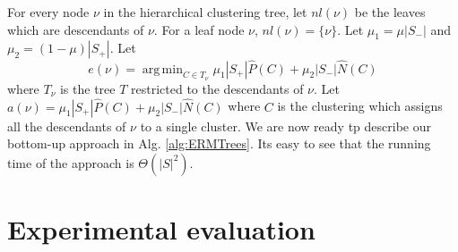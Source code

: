 \documentclass[12pt]{article}
\DeclareMathOperator*{\argmin}{arg\,min}
\begin{document}
For every node $\nu$ in the hierarchical clustering tree, let $nl(\nu)$ be the leaves which are descendants of $\nu$. For a leaf node $\nu$, $nl(\nu) = \{\nu\}$. Let $\mu_1 = \mu|S_-|$ and $\mu_2 = (1-\mu)|S_+|$. Let $$e(\nu) = \argmin_{C \in T_{\nu}} \mu_1|S_+|\hat P(C) + \mu_2|S_-|\hat N(C)$$ where $T_{\nu}$ is the tree $T$ restricted to the descendants of $\nu$. Let $a(\nu) = \mu_1|S_+|\hat P(C) + \mu_2|S_-|\hat N(C)$ where $C$ is the clustering which assigns all the descendants of $\nu$ to a single cluster. We are now ready tp describe our bottom-up approach in Alg. \ref{alg:ERMTrees}. Its easy to see that the running time of the approach is $\Theta(|S|^2)$. 

\section{Experimental evaluation}
\label{sec:evaluation}
\end{document}
